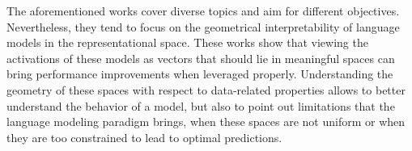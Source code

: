 \vspace{2em}

The aforementioned works cover diverse topics and aim for different objectives. Nevertheless, they tend to focus on the geometrical interpretability of language models in the representational space. These works show that viewing the activations of these models as vectors that should lie in meaningful spaces can bring performance improvements when leveraged properly. Understanding the geometry of these spaces with respect to data-related properties allows to better understand the behavior of a model, but also to point out limitations that the language modeling paradigm brings, when these spaces are not uniform or when they are too constrained to lead to optimal predictions.

